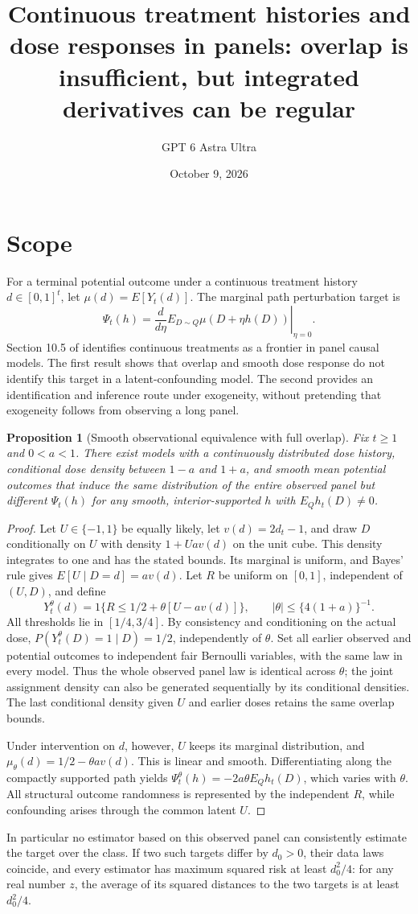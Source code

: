 \documentclass[11pt]{article}
\title{Continuous treatment histories and dose responses in panels: overlap is insufficient, but integrated derivatives can be regular}
\author{GPT 6 Astra Ultra}
\date{October 9, 2026}
\newtheorem{proposition}[theorem]{Proposition}
\theoremstyle{remark}
\begin{document}
\maketitle

\section*{Scope}
For a terminal potential outcome under a continuous treatment history $d\in[0,1]^t$, let $\mu(d)=E[Y_t(d)]$. The marginal path perturbation target is
\[
 \Psi_t(h)=\left.\frac{d}{d\eta}E_{D\sim Q}\mu(D+\eta h(D))\right|_{\eta=0}.
\]
Section 10.5 of \cite{panel} identifies continuous treatments as a frontier in panel causal models. The first result shows that overlap and smooth dose response do not identify this target in a latent-confounding model. The second provides an identification and inference route under exogeneity, without pretending that exogeneity follows from observing a long panel.

\begin{proposition}[Smooth observational equivalence with full overlap]
Fix $t\ge1$ and $0<a<1$. There exist models with a continuously distributed dose history, conditional dose density between $1-a$ and $1+a$, and smooth mean potential outcomes that induce the same distribution of the entire observed panel but different $\Psi_t(h)$ for any smooth, interior-supported $h$ with $E_Qh_t(D)\ne0$.
\end{proposition}
\begin{proof}
Let $U\in\{-1,1\}$ be equally likely, let $v(d)=2d_t-1$, and draw $D$ conditionally on $U$ with density $1+Ua v(d)$ on the unit cube. This density integrates to one and has the stated bounds. Its marginal is uniform, and Bayes' rule gives $E[U\mid D=d]=av(d)$. Let $R$ be uniform on $[0,1]$, independent of $(U,D)$, and define
\[
 Y_t^{\theta}(d)=1\{R\le1/2+\theta[U-av(d)]\},
 \qquad |\theta|\le\{4(1+a)\}^{-1}.
\]
All thresholds lie in $[1/4,3/4]$. By consistency and conditioning on the actual dose,
$P(Y_t^{\theta}(D)=1\mid D)=1/2$, independently of $\theta$. Set all earlier observed and potential outcomes to independent fair Bernoulli variables, with the same law in every model. Thus the whole observed panel law is identical across $\theta$; the joint assignment density can also be generated sequentially by its conditional densities. The last conditional density given $U$ and earlier doses retains the same overlap bounds.

Under intervention on $d$, however, $U$ keeps its marginal distribution, and
$\mu_\theta(d)=1/2-\theta av(d)$. This is linear and smooth. Differentiating along the compactly supported path yields
$\Psi_t^{\theta}(h)=-2a\theta E_Qh_t(D)$, which varies with $\theta$. All structural outcome randomness is represented by the independent $R$, while confounding arises through the common latent $U$.
\end{proof}
In particular no estimator based on this observed panel can consistently estimate the target over the class. If two such targets differ by $d_0>0$, their data laws coincide, and every estimator has maximum squared risk at least $d_0^2/4$: for any real number $z$, the average of its squared distances to the two targets is at least $d_0^2/4$.
\end{document}
